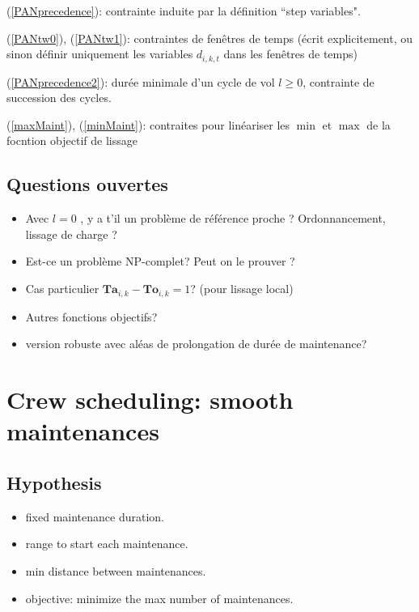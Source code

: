 \documentclass[a4paper,11pt]{article}
\begin{document}
    (\ref{PANprecedence}): contrainte induite par la définition ``step variables".

    (\ref{PANtw0}), (\ref{PANtw1}): contraintes de fenêtres de temps (écrit explicitement, ou sinon définir uniquement les variables $d_{i,k,t}$
    dans les fenêtres de temps)

    (\ref{PANprecedence2}): durée minimale d'un cycle de vol $l\geqslant 0$, contrainte de succession des cycles.

    (\ref{maxMaint}), (\ref{minMaint}): contraites pour linéariser les $\min$ et $\max$ de la focntion objectif de lissage

    \subsection{Questions ouvertes}

    \begin{itemize}
    \item Avec $l=0$ , y a t'il un problème de référence proche ? Ordonnancement, lissage de charge ?
    \item Est-ce un problème NP-complet? Peut on le prouver ?
     \item Cas particulier $\mathbf{Ta}_{i,k}-\mathbf{To}_{i,k}=1$? (pour lissage local)
     \item Autres fonctions objectifs?
     \item version robuste avec aléas de prolongation de durée de maintenance?
    \end{itemize}

\clearpage

\section{Crew scheduling: smooth maintenances}

    \subsection{Hypothesis}

    \begin{itemize}
     \item fixed maintenance duration.
     \item range to start each maintenance.
     \item min distance between maintenances.
     \item objective: minimize the max number of maintenances.
    \end{itemize}
\end{document}
